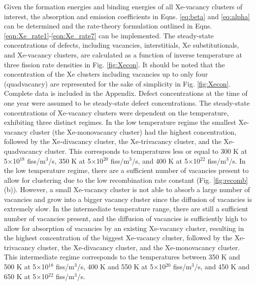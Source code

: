 \documentclass[preprint,12pt]{elsarticle}
\begin{document}
Given the formation energies and binding energies of all Xe-vacancy clusters of interest, the absorption and emission coefficients in Eqns. \ref{eq:beta} and \ref{eq:alpha} can be determined and the rate-theory formulation outlined in Eqns. \ref{eqn:Xe_rate1}-\ref{eqn:Xe_rate7} can be implemented. The steady-state concentrations of defects, including vacancies, interstitials, Xe substitutionals, and Xe-vacancy clusters, are calculated as a function of inverse temperature at three fission rate densities in Fig. \ref{fig:Xecon}. It should be noted that the concentration of the Xe clusters including vacancies up to only four (quadvacancy) are represented for the sake of simplicity in Fig. \ref{fig:Xecon}. Complete data is included in the Appendix. Defect concentrations at the time of one year were assumed to be steady-state defect concentrations. The steady-state concentrations of Xe-vacancy clusters were dependent on the temperature, exhibiting three distinct regimes. In the low temperature regime the smallest Xe-vacancy cluster (the Xe-monovacancy cluster) had the highest concentration, followed by the Xe-divacancy cluster, the Xe-trivacancy cluster, and the Xe-quadvacancy cluster. This corresponds to temperatures less or equal to 300 K at 5$\times$10$^{18}$ fiss/m$^{3}$/s, 350 K at 5$\times$10$^{20}$ fiss/m$^{3}$/s, and 400 K at 5$\times$10$^{22}$ fiss/m$^{3}$/s. In the low temperature regime, there are a sufficient number of vacancies present to allow for clustering due to the low recombination rate constant (Fig. \ref{fig:recomb}(b)). However, a small Xe-vacancy cluster is not able to absorb a large number of vacancies and grow into a bigger vacancy cluster since the diffusion of vacancies is extremely slow. In the intermediate temperature range, there are still a sufficient number of vacancies present, and the diffusion of vacancies is sufficiently high to allow for absorption of vacancies by an existing Xe-vacancy cluster, resulting in the highest concentration of the biggest Xe-vacancy cluster, followed by the Xe-trivacancy cluster, the Xe-divacancy cluster, and the Xe-monovacancy cluster. This intermediate regime corresponds to the temperatures between 350 K and 500 K at 5$\times$10$^{18}$ fiss/m$^{3}$/s, 400 K and 550 K at 5$\times$10$^{20}$ fiss/m$^{3}$/s, and 450 K and 650 K at 5$\times$10$^{22}$ fiss/m$^{3}$/s.
\end{document}
